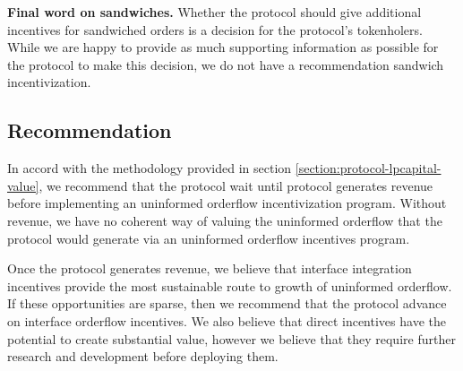     \textbf{Final word on sandwiches.}
    Whether the protocol should give additional incentives for sandwiched orders is a decision for the protocol's tokenholers. While we are happy to provide as much supporting information as possible for the protocol to make this decision, we do not have a recommendation sandwich incentivization.

\subsection{Recommendation}
    In accord with the methodology provided in section \ref{section:protocol-lpcapital-value}, we recommend that the protocol wait until protocol generates revenue before implementing an uninformed orderflow incentivization program. Without revenue, we have no coherent way of valuing the uninformed orderflow that the protocol would generate via an uninformed orderflow incentives program.

    Once the protocol generates revenue, we believe that interface integration incentives provide the most sustainable route to growth of uninformed orderflow. If these opportunities are sparse, then we recommend that the protocol advance on interface orderflow incentives. We also believe that direct incentives have the potential to create substantial value, however we believe that they require further research and development before deploying them.
